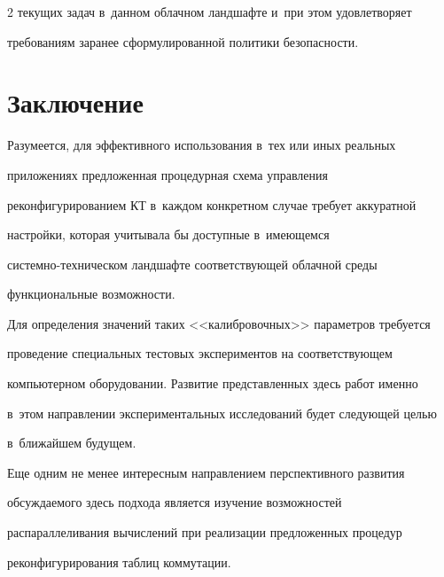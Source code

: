 \begin{multicols}{2}
текущих задач в~данном облачном ландшафте и~при этом удовлетворяет 


требованиям заранее сформулированной политики безопасности.





\vspace*{-6pt}


  


\section{Заключение}





\vspace*{-2pt}


  


  Разумеется, для эффективного использования в~тех или иных реальных 


приложениях предложенная процедурная схема управления 


реконфигурированием КТ в~каждом конкретном случае требует аккуратной 


настройки, которая учитывала бы доступные в~имеющемся  


сис\-тем\-но-тех\-ни\-че\-ском ландшафте соответствующей облачной среды 


функциональные возможности. 


  


  Для определения значений таких <<калибровочных>> параметров требуется 


проведение специальных тестовых экспериментов на соответствующем 


компьютерном оборудовании. Развитие пред\-став\-лен\-ных здесь работ именно 


в~этом направлении экспериментальных исследований будет сле\-ду\-ющей целью 


в~ближайшем будущем.


  


  Еще одним не менее интересным направлением перспективного развития 


обсуждаемого здесь подхода является изучение возможностей 


распараллеливания вычислений при реализации предложенных процедур 


реконфигурирования таблиц коммутации.



\end{multicols}
